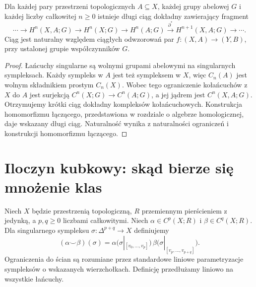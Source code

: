 \begin{twierdzenie}
Dla każdej pary przestrzeni topologicznych $A\subseteq X$,
każdej grupy abelowej $G$ i każdej liczby całkowitej
$n\geq0$ istnieje długi ciąg dokładny
zawierający fragment
\[
\cdots\to H^n(X,A;G)\to H^n(X;G)\to H^n(A;G)
\xrightarrow{\,\partial^*\,}H^{n+1}(X,A;G)\to\cdots.
\]
Ciąg jest naturalny względem ciągłych odwzorowań par
$f:(X,A)\to(Y,B)$, przy ustalonej grupie współczynników $G$.
\end{twierdzenie}
\begin{proof}
Łańcuchy singularne są wolnymi grupami abelowymi na singularnych
sympleksach. Każdy sympleks w $A$ jest też sympleksem w $X$, więc
$C_n(A)$ jest wolnym składnikiem prostym $C_n(X)$.
Wobec tego ograniczenie kołańcuchów z $X$ do $A$ jest surjekcją
$C^n(X;G)\to C^n(A;G)$, a jej jądrem jest $C^n(X,A;G)$.
Otrzymujemy krótki ciąg dokładny kompleksów kołańcuchowych.
Konstrukcja homomorfizmu łączącego, przedstawiona w rozdziale
o algebrze homologicznej, daje wskazany długi ciąg. Naturalność
wynika z naturalności ograniczeń i konstrukcji homomorfizmu łączącego.
\end{proof}

\section{Iloczyn kubkowy: skąd bierze się mnożenie klas}

\begin{definicja}
Niech $X$ będzie przestrzenią topologiczną, $R$ przemiennym
pierścieniem z jedynką, a $p,q\geq0$ liczbami całkowitymi.
Niech $\alpha\in C^p(X;R)$ i $\beta\in C^q(X;R)$.
Dla singularnego sympleksu $\sigma:\Delta^{p+q}\to X$ definiujemy
\[
(\alpha\smile\beta)(\sigma)=
\alpha\bigl(\sigma|_{[v_0,\ldots,v_p]}\bigr)\,
\beta\bigl(\sigma|_{[v_p,\ldots,v_{p+q}]}\bigr).
\]
Ograniczenia do ścian są rozumiane przez standardowe liniowe
parametryzacje sympleksów o wskazanych wierzchołkach.
Definicję przedłużamy liniowo na wszystkie łańcuchy.
\end{definicja}

